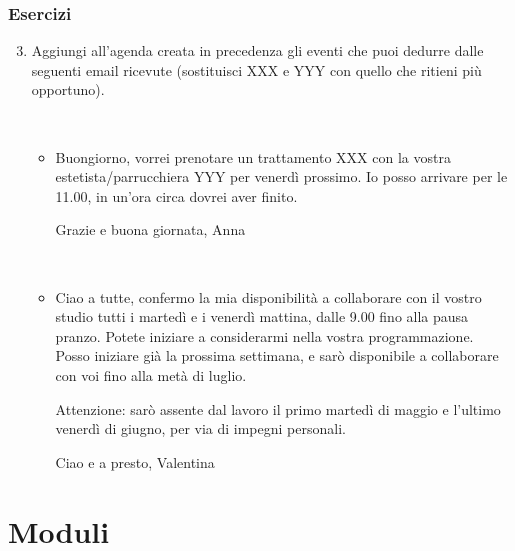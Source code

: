 \documentclass[handout]{beamer}
\begin{document}
\begin{frame}
  \frametitle{Esercizi}
  \begin{enumerate}\setcounter{enumi}{2}
    \item Aggiungi all'agenda creata in precedenza gli eventi che puoi dedurre dalle seguenti email ricevute (sostituisci XXX e YYY con quello che ritieni più opportuno).
    
    ~

    \begin{itemize}
      \item Buongiorno, vorrei prenotare un trattamento XXX con la vostra estetista/parrucchiera YYY per venerdì prossimo. Io posso arrivare per le 11.00, in un'ora circa dovrei aver finito.

      Grazie e buona giornata, Anna

      ~
      \item Ciao a tutte, confermo la mia disponibilità a collaborare con il vostro studio tutti i martedì e i venerdì mattina, dalle 9.00 fino alla pausa pranzo. Potete iniziare a considerarmi nella vostra programmazione. Posso iniziare già la prossima settimana, e sarò disponibile a collaborare con voi fino alla metà di luglio.

      Attenzione: sarò assente dal lavoro il primo martedì di maggio e l'ultimo venerdì di giugno, per via di impegni personali.

      Ciao e a presto, Valentina
    \end{itemize}
  \end{enumerate}
\end{frame}



\section{Moduli}
\end{document}
